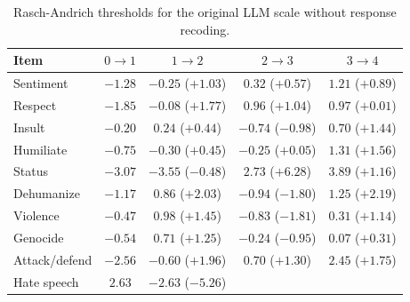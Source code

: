 \begin{table}[t]
\centering
\small
\caption{Rasch-Andrich thresholds for the original LLM scale without response recoding.}
\label{tab:llm-no-recoding-andrich-thresholds}
\setlength{\tabcolsep}{5pt}
\renewcommand{\arraystretch}{1.08}
\begin{tabular*}{\textwidth}{@{\extracolsep{\fill}}lcccc@{}}
\hline
Item & $0\to1$ & $1\to2$ & $2\to3$ & $3\to4$ \\
\hline
Sentiment & $-1.28$ & $-0.25$ ($+1.03$) & $0.32$ ($+0.57$) & $1.21$ ($+0.89$) \\
Respect & $-1.85$ & $-0.08$ ($+1.77$) & $0.96$ ($+1.04$) & $0.97$ ($+0.01$) \\
Insult & $-0.20$ & $0.24$ ($+0.44$) & $-0.74$ ($-0.98$) & $0.70$ ($+1.44$) \\
Humiliate & $-0.75$ & $-0.30$ ($+0.45$) & $-0.25$ ($+0.05$) & $1.31$ ($+1.56$) \\
Status & $-3.07$ & $-3.55$ ($-0.48$) & $2.73$ ($+6.28$) & $3.89$ ($+1.16$) \\
Dehumanize & $-1.17$ & $0.86$ ($+2.03$) & $-0.94$ ($-1.80$) & $1.25$ ($+2.19$) \\
Violence & $-0.47$ & $0.98$ ($+1.45$) & $-0.83$ ($-1.81$) & $0.31$ ($+1.14$) \\
Genocide & $-0.54$ & $0.71$ ($+1.25$) & $-0.24$ ($-0.95$) & $0.07$ ($+0.31$) \\
Attack/defend & $-2.56$ & $-0.60$ ($+1.96$) & $0.70$ ($+1.30$) & $2.45$ ($+1.75$) \\
Hate speech & $2.63$ & $-2.63$ ($-5.26$) &  &  \\
\hline
\end{tabular*}
\end{table}

